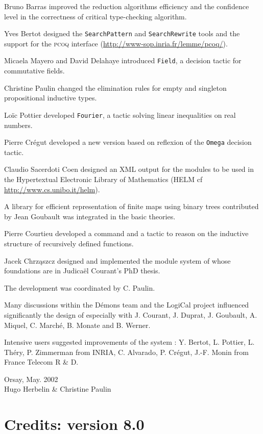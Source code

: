 Bruno Barras improved the reduction algorithms efficiency and
the confidence level in the correctness of {\Coq} critical type-checking
algorithm.

Yves Bertot designed  the \texttt{SearchPattern} and
\texttt{SearchRewrite} tools and the support for the \textsc{pcoq} interface 
(\url{http://www-sop.inria.fr/lemme/pcoq/}).

Micaela Mayero and David Delahaye introduced {\tt Field}, a decision tactic for commutative fields.

Christine Paulin changed the elimination rules for empty and singleton
propositional inductive types.

Loïc Pottier developed {\tt Fourier}, a tactic solving linear inequalities on real numbers.

Pierre Crégut developed a new version based on reflexion of the {\tt Omega}
decision tactic.

Claudio Sacerdoti Coen designed an XML output for the {\Coq}
modules to be used in the Hypertextual Electronic Library of
Mathematics (HELM cf \url{http://www.cs.unibo.it/helm}).

A library for efficient representation of finite maps using binary trees
contributed by Jean Goubault was integrated in the basic theories.

Pierre Courtieu developed a command and a tactic to reason on the
inductive structure of recursively defined functions.

Jacek Chrz\k{a}szcz designed and implemented the module system of
{\Coq} whose foundations are in Judicaël Courant's PhD thesis.

\bigskip

The development was coordinated by C. Paulin.

Many discussions within the Démons team and the LogiCal project
influenced significantly the design of {\Coq} especially with 
J. Courant, J. Duprat, J. Goubault, A. Miquel,
C. Marché, B. Monate and B. Werner.

Intensive users suggested improvements of the system :
Y. Bertot, L. Pottier, L. Théry, P. Zimmerman from INRIA,
C. Alvarado, P. Crégut, J.-F. Monin from France Telecom R \& D.
\begin{flushright}
Orsay, May. 2002\\
Hugo Herbelin \& Christine Paulin
\end{flushright}

\section*{Credits: version 8.0}

